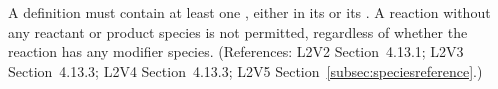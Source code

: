 A \Reaction definition must contain at least one \SpeciesReference, either
in its  or its .  A reaction
without any reactant or product species is not permitted, regardless of
whether the reaction has any modifier species.  (References: L2V2
Section~4.13.1; L2V3 Section~4.13.3; L2V4 Section~4.13.3; L2V5 Section~\ref{subsec:speciesreference}.)

